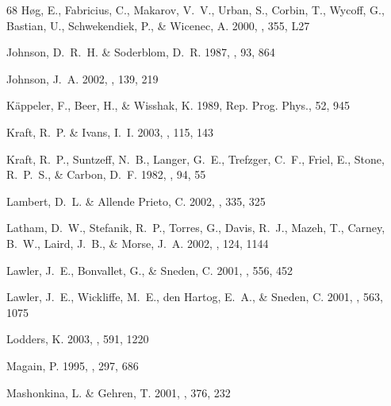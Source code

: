 \documentclass[12pt,preprint]{aastex}
\begin{document}
{\begin{thebibliography}{68}
{H{\o}g}, E., {Fabricius}, C., {Makarov}, V.~V., {Urban}, S., {Corbin}, T.,
  {Wycoff}, G., {Bastian}, U., {Schwekendiek}, P., \& {Wicenec}, A. 2000, \aap,
  355, L27

{Johnson}, D.~R.~H. \& {Soderblom}, D.~R. 1987, \aj, 93, 864

{Johnson}, J.~A. 2002, \apjs, 139, 219

{K\"appeler}, F., {Beer}, H., \& {Wisshak}, K. 1989, Rep. Prog. Phys., 52, 945

{Kraft}, R.~P. \& {Ivans}, I.~I. 2003, \pasp, 115, 143

{Kraft}, R.~P., {Suntzeff}, N.~B., {Langer}, G.~E., {Trefzger}, C.~F., {Friel},
  E., {Stone}, R.~P.~S., \& {Carbon}, D.~F. 1982, \pasp, 94, 55

{Lambert}, D.~L. \& {Allende Prieto}, C. 2002, \mnras, 335, 325

{Latham}, D.~W., {Stefanik}, R.~P., {Torres}, G., {Davis}, R.~J., {Mazeh}, T.,
  {Carney}, B.~W., {Laird}, J.~B., \& {Morse}, J.~A. 2002, \aj, 124, 1144

{Lawler}, J.~E., {Bonvallet}, G., \& {Sneden}, C. 2001{}, \apj,
  556, 452

{Lawler}, J.~E., {Wickliffe}, M.~E., {den Hartog}, E.~A., \& {Sneden}, C.
  2001{}, \apj, 563, 1075

{Lodders}, K. 2003, \apj, 591, 1220

{Magain}, P. 1995, \aap, 297, 686

{Mashonkina}, L. \& {Gehren}, T. 2001, \aap, 376, 232


\end{thebibliography}}
\end{document}

